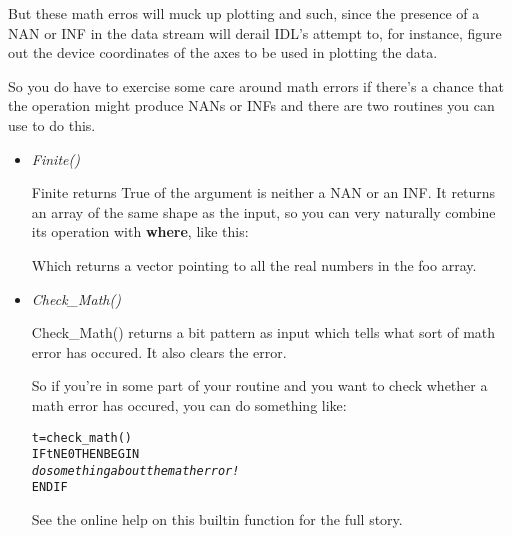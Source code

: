   But these math erros will muck up plotting and such, since the
  presence of a NAN or INF in the data stream will derail IDL's
  attempt to, for instance, figure out the device coordinates of the
  axes to be used in plotting the data.

  So you do have to exercise some care around math errors if there's
  a chance that the operation might produce NANs or INFs and there are
  two routines you can use to do this.

  \begin{itemize}
     \item \textit{Finite()}

        Finite returns True of the argument is neither a NAN or an
        INF. It returns an array of the same shape as the input, so
        you can very naturally combine its operation with
        \textbf{where}, like this:


        Which returns a vector pointing to all the real numbers in
        the foo array.

      \item \textit{Check\_Math()}

        Check\_Math() returns a bit pattern as input which tells what
        sort of math error has occured. It also clears the error. 
 
        So if you're in some part of your routine and you want to
        check whether a math error has occured, you can do something
        like:


\begin{alltt}
  t=check_math()
  IF t NE 0 THEN BEGIN 
     \textit{do something about the math error!}
  ENDIF 
\end{alltt}

        See the online help on this builtin function for the full story.
   \end{itemize}

  

